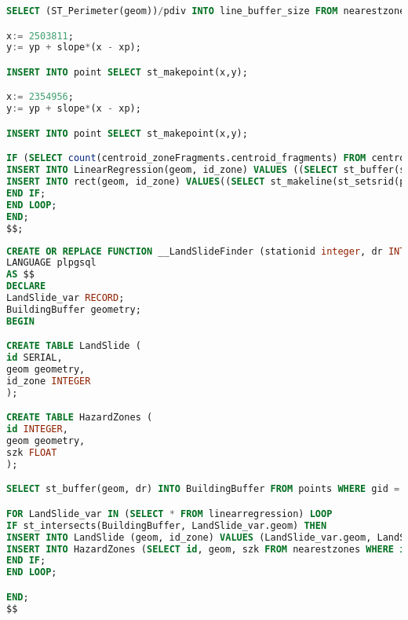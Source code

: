 \begin{lstlisting}[language=SQL]
SELECT (ST_Perimeter(geom))/pdiv INTO line_buffer_size FROM nearestzones WHERE id = id_zone_var;

x:= 2503811;
y:= yp + slope*(x - xp);

INSERT INTO point SELECT st_makepoint(x,y);

x:= 2354956;
y:= yp + slope*(x - xp);

INSERT INTO point SELECT st_makepoint(x,y);

IF (SELECT count(centroid_zoneFragments.centroid_fragments) FROM centroid_zoneFragments) > 3 THEN
INSERT INTO LinearRegression(geom, id_zone) VALUES ((SELECT st_buffer(st_makeline(st_setsrid(point.geom,3004)), line_buffer_size) FROM point), id_zone_var);
INSERT INTO rect(geom, id_zone) VALUES((SELECT st_makeline(st_setsrid(point.geom,3004)) FROM point), id_zone_var);
END IF;
END LOOP;
END;
$$;

\end{lstlisting}

\begin{lstlisting}[language=SQL]
CREATE OR REPLACE FUNCTION __LandSlideFinder (stationid integer, dr INTEGER) RETURNS void
LANGUAGE plpgsql
AS $$
DECLARE
LandSlide_var RECORD;
BuildingBuffer geometry;
BEGIN

CREATE TABLE LandSlide (
id SERIAL,
geom geometry,
id_zone INTEGER
);

CREATE TABLE HazardZones (
id INTEGER,
geom geometry,
szk FLOAT
);

SELECT st_buffer(geom, dr) INTO BuildingBuffer FROM points WHERE gid = stationid;

FOR LandSlide_var IN (SELECT * FROM linearregression) LOOP
IF st_intersects(BuildingBuffer, LandSlide_var.geom) THEN
INSERT INTO LandSlide (geom, id_zone) VALUES (LandSlide_var.geom, LandSlide_var.id_zone);
INSERT INTO HazardZones (SELECT id, geom, szk FROM nearestzones WHERE id = LandSlide_var.id_zone);
END IF;
END LOOP;

END;
$$
\end{lstlisting}

